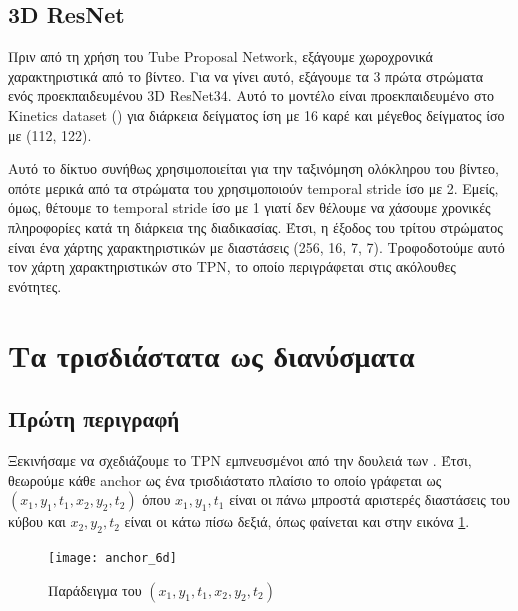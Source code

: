 \subsection{\en 3D ResNet \gr}
Πριν από τη χρήση του \en Tube Proposal Network\gr, εξάγουμε  χωροχρονικά χαρακτηριστικά από το βίντεο. Για να γίνει αυτό, εξάγουμε τα 3 πρώτα στρώματα ενός
προεκπαιδευμένου \en 3D ResNet34\gr. Αυτό το μοντέλο είναι προεκπαιδευμένο στο \en Kinetics dataset (\cite{DBLP:journals/corr/KayCSZHVVGBNSZ17}\gr) για διάρκεια δείγματος ίση με
16 καρέ και μέγεθος δείγματος ίσο με (112, 122).  \par
Αυτό το δίκτυο συνήθως χρησιμοποιείται για την ταξινόμηση ολόκληρου του βίντεο, οπότε μερικά από τα στρώματα του χρησιμοποιούν \en temporal stride \gr ίσο με 2.
Εμείς, όμως, θέτουμε το \en temporal stride \gr ίσο με 1 γιατί δεν θέλουμε να χάσουμε χρονικές πληροφορίες κατά τη διάρκεια της διαδικασίας.
Έτσι, η έξοδος του τρίτου στρώματος είναι ένα χάρτης χαρακτηριστικών με διαστάσεις (256, 16, 7, 7). Τροφοδοτούμε αυτό τον χάρτη  χαρακτηριστικών στο \en TPN\gr,
το οποίο περιγράφεται στις ακόλουθες ενότητες.

\section{Τα τρισδιάστατα   ως   διανύσματα}
\subsection{Πρώτη περιγραφή}
Ξεκινήσαμε να σχεδιάζουμε το \en TPN  \gr εμπνευσμένοι από την δουλειά των \en\cite{DBLP:journals/corr/HouCS17}\gr. Έτσι, θεωρούμε κάθε \en anchor \gr ως ένα
τρισδιάστατο πλαίσιο  το οποίο γράφεται ως \en $(x_1, y_1, t_1, x_2, y_2, t_2)$ \gr  όπου \en $x_1, y_1, t_1$ \gr  είναι
οι πάνω μπροστά αριστερές διαστάσεις του κύβου και \en $x_2, y_2, t_2$ \gr  είναι οι κάτω πίσω δεξιά, όπως φαίνεται και στην εικόνα \ref{fig:gr_anchor_6d}.

\begin{figure}[h]
  \centering
  \texttt{[image: anchor\_6d]}
  \caption{\gr Παράδειγμα του  $(x_1,y_1,t_1,x_2,y_2,t_2)$}

  \label{fig:gr_anchor_6d}
\end{figure}

